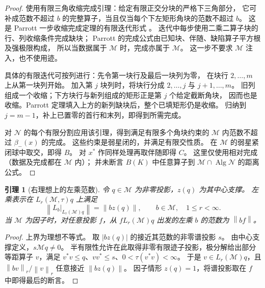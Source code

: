 \documentclass[UTF8,11pt,a4paper,fontset=fandol]{ctexart}
\newtheorem{lemma}[theorem]{引理}
\theoremstyle{remark}
\numberwithin{equation}{section}
\newcommand{\M}{\mathcal M}
\newcommand{\N}{\mathcal N}
\newcommand{\norm}[1]{\left\lVert #1\right\rVert}
\begin{document}
\begin{proof}
使用有限三角收缩完成引理：给定有限正交分块的严格下三角部分，
它可补成范数不超过 $b$ 的完整算子，当且仅当每个下左矩形角块的范数不超过 $b$。
这是 Parrott 一步收缩完成定理的有限迭代形式 \cite{Parrott}。
迭代中每步使用二乘二算子块的行、列收缩条件完成缺块；
Parrott 的完成公式由已知块、伴随、缺陷算子平方根及强极限构成，
所以当数据属于 $\M$ 时，完成亦属于 $\M$。
这一步不要求 $\M$ 注入，也不使用迹。

具体的有限迭代可按列进行：先令第一块行及最后一块列为零，
在块行 $2,\ldots,m$ 上从第一块列开始。
加入第 $j$ 块列时，将块行分成 $2,\ldots,j$ 与 $j+1,\ldots,m$。
旧列组成一个收缩；下方块行与新列组成的矩形正是第 $j$ 个给定截断角块，
因而也是收缩。Parrott 定理填入上方的新列缺块后，整个已填矩形仍是收缩。
归纳到 $j=m-1$，补上已置零的首行和末列，即得到所需完成。

对 $\N$ 的每个有限分割应用该引理，得到满足有限多个角块约束的
$\M$ 内范数不超过 $\beta_-(x)$ 的完成。
这些约束是弱星闭的，并满足有限交性质。
在 $\M$ 的弱星紧闭球中取交，即得 $B$。
对 $x^*$ 作同样处理再取伴随即得 $C$。
这里仅使用相对完成（数据及完成都在 $\M$ 内）；
并未断言 $B(K)$ 中任意算子到 $\M\cap\operatorname{Alg}\N$ 的距离公式。
\end{proof}

\begin{lemma}[右理想上的左乘范数]\label{lem:ideal}
令 $q\in\M$ 为非零投影，$z(q)$ 为其中心支撑。
左乘表示在 $L_r(\M,\tau)q$ 上满足
\[
 \norm{L_b|_{L_r(\M)q}}=\norm{bz(q)},\qquad b\in\M,\quad1\leq r<\infty.
\]
当 $\M$ 为因子时，对任意投影 $f$，从 $fL_r(\M)q$ 出发的左乘 $b$ 的范数为
$\norm{bf}$。
\end{lemma}

\begin{proof}
上界为理想不等式。
取 $|bz(q)|$ 的接近其范数的非零谱投影 $s$。
由中心支撑定义，$s\M q\ne0$。
半有限性允许在此取得非零有限迹子投影，极分解给出部分等距算子
$v$，满足 $v^*v\leq q$、$vv^*\leq s$、$0<\tau(v^*v)<\infty$。
于是 $v\in L_r(\M)q$，且
$\norm{bv}_r/\norm v_r$ 任意接近 $\norm{bz(q)}$。
因子情形 $z(q)=1$，将谱投影取在 $f$ 中即得最后的断言。
\end{proof}
\end{document}
